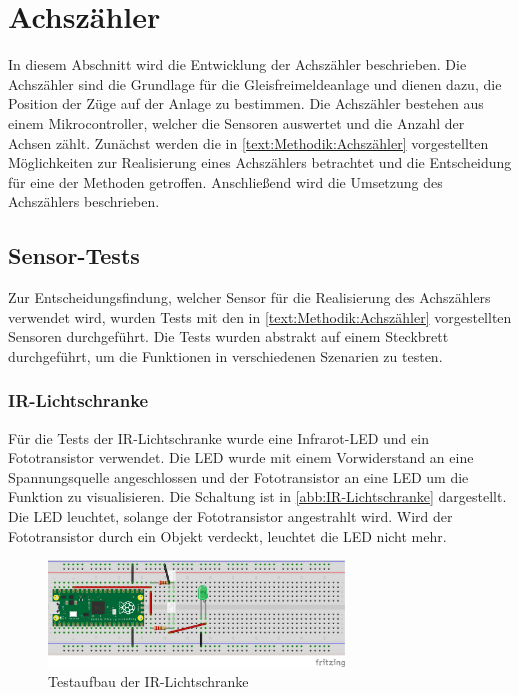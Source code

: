 \section{Achszähler}\label{text:Entwicklung-der-GFA:Achszähler}

In diesem Abschnitt wird die Entwicklung der Achszähler beschrieben. Die Achszähler sind die Grundlage für die Gleisfreimeldeanlage und dienen dazu, die Position der Züge auf der Anlage zu bestimmen. Die Achszähler bestehen aus einem Mikrocontroller, welcher die Sensoren auswertet und die Anzahl der Achsen zählt. Zunächst werden die in \autoref{text:Methodik:Achszähler}  vorgestellten Möglichkeiten zur Realisierung eines Achszählers betrachtet und die Entscheidung für eine der Methoden getroffen. Anschließend wird die Umsetzung des Achszählers beschrieben.

\subsection{Sensor-Tests}\label{text:Entwicklung-der-GFA:Achszähler:Sensor-Tests}

Zur Entscheidungsfindung, welcher Sensor für die Realisierung des Achszählers verwendet wird, wurden Tests mit den in \autoref{text:Methodik:Achszähler}  vorgestellten Sensoren durchgeführt. Die Tests wurden abstrakt auf einem Steckbrett durchgeführt, um die Funktionen in verschiedenen Szenarien zu testen.

\subsubsection{IR-Lichtschranke}\label{text:Entwicklung-der-GFA:Achszähler:Sensor-Tests:Lichtschranke}

Für die Tests der IR-Lichtschranke wurde eine Infrarot-LED und ein Fototransistor verwendet. Die LED wurde mit einem Vorwiderstand an eine Spannungsquelle angeschlossen und der Fototransistor an eine LED um die Funktion zu visualisieren. Die Schaltung ist in \autoref{abb:IR-Lichtschranke} dargestellt. Die LED leuchtet, solange der Fototransistor angestrahlt wird. Wird der Fototransistor durch ein Objekt verdeckt, leuchtet die LED nicht mehr.

\begin{figure}[H]
    \centering
    \includegraphics[width=0.7\textwidth]{Assets/Images/4-Entwicklung-der-GFA/IR-Test_bb.png}
    \caption{Testaufbau der IR-Lichtschranke}\label{abb:IR-Lichtschranke}
\end{figure}

